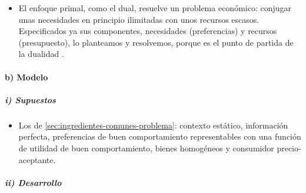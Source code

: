 \documentclass[11pt]{article}
\begin{document}
\begin{itemize}
\item El enfoque primal, como el dual, resuelve un problema económico: conjugar unas necesidades en principio ilimitadas con unos recursos escasos. Especificados ya sus componentes, necesidades (preferencias) y recursos (presupuesto), lo planteamos y resolvemos, porque es el punto de partida de la dualidad .
\end{itemize}

\paragraph{b) Modelo}

\subparagraph{i) Supuestos}

\begin{itemize}
\item Los de \ref{sec:ingredientes-comunes-problema}: contexto estático, información perfecta, preferencias de buen comportamiento representables con una función de utilidad de buen comportamiento, bienes homogéneos y consumidor precio-aceptante.
\end{itemize}

\subparagraph{ii) Desarrollo}
\end{document}
